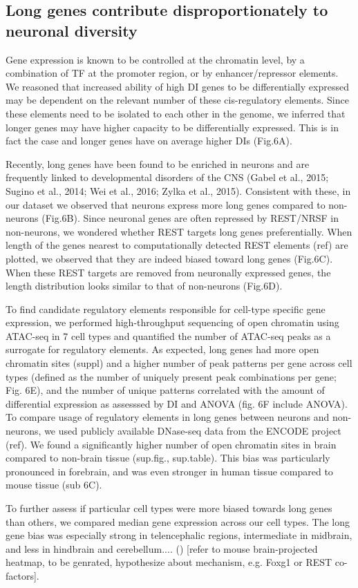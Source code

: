 \subsection{Long genes contribute disproportionately to neuronal diversity}

Gene expression is known to be controlled at the chromatin level, by a combination of TF at the promoter region, or by enhancer/repressor elements. We reasoned that increased ability of high DI genes to be differentially expressed may be dependent on the relevant number of these cis-regulatory elements. Since these elements need to be isolated to each other in the genome, we inferred that longer genes may have higher capacity to be differentially expressed. This is in fact the case and longer genes have on average higher DIs (Fig.6A).

Recently, long genes have been found to be enriched in neurons and are frequently linked to developmental disorders of the CNS (Gabel et al., 2015; Sugino et al., 2014; Wei et al., 2016; Zylka et al., 2015). Consistent with these, in our dataset we observed that neurons express more long genes compared to non-neurons (Fig.6B). Since neuronal genes are often repressed by REST/NRSF in non-neurons, we wondered whether REST targets long genes preferentially. When length of the genes nearest to computationally detected REST elements (ref) are plotted, we observed that they are indeed biased toward long genes (Fig.6C). When these REST targets are removed from neuronally expressed genes, the length distribution looks similar to that of non-neurons (Fig.6D).

To find candidate regulatory elements responsible for cell-type specific gene expression, we performed high-throughput sequencing of open chromatin using ATAC-seq in 7 cell types and quantified the number of ATAC-seq peaks as a surrogate for regulatory elements. As expected, long genes had more open chromatin sites (suppl) and a higher number of peak patterns per gene across cell types (defined as the number of uniquely present peak combinations per gene;  Fig. 6E), and the number of unique patterns correlated with the amount of differential expression as assesssed by DI and ANOVA (fig. 6F include ANOVA).
To compare usage of regulatory elements in long genes between neurons and non-neurons, we used publicly available DNase-seq data from the ENCODE project (ref). We found a significantly higher number of open chromatin sites in brain compared to non-brain tissue (sup.fig., sup.table). This bias was  particularly pronounced in forebrain, and was even stronger in human tissue compared to mouse tissue (sub 6C).

To further assess if particular cell types were more biased towards long genes than others, we compared median gene expression across our cell types. The long gene bias was especially strong in telencephalic regions, intermediate in midbrain, and less in hindbrain and cerebellum.... () [refer to mouse brain-projected heatmap, to be genrated, hypothesize about mechanism, e.g. Foxg1 or REST co-factors].